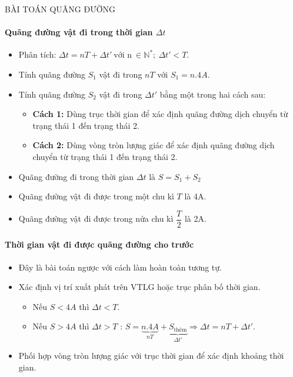 \begin{dang}{BÀI TOÁN QUÃNG ĐƯỜNG}
\setcounter{paragraph}{0}
\paragraph{Quãng đường vật đi trong thời gian $\Delta t$}
\begin{itemize}
\item Phân tích: $\Delta t=nT+\Delta t'\ \text{với n}\ \in \mathbb{N}^*;\ \Delta t'<T$.
\item Tính quãng đường $S_1$ vật đi trong $nT$ với $S_1 = n.4A$.
\item Tính quãng đường $S_2$ vật đi trong $\Delta t'$ bằng một trong hai cách sau:
\begin{itemize}
\item \textbf{Cách 1:} Dùng trục thời gian để xác định quãng đường dịch chuyển từ trạng thái 1 đến trạng thái 2.
\item \textbf{Cách 2:} Dùng vòng tròn lượng giác để xác định quãng đường dịch chuyển từ trạng thái 1 đến trạng thái 2.  
\end{itemize}
\item Quãng đường đi trong thời gian $\Delta t$ là $S=S_1+S_2$
\end{itemize}
\begin{note}
\begin{itemize}
\item Quãng đường vật đi được trong một chu kì $T$ là 4A.
\item Quãng đường vật đi được trong nửa chu kì $\dfrac{T}{2}$ là 2A.
\end{itemize}
\end{note}
\paragraph{Thời gian vật đi được quãng đường cho trước}
\begin{itemize}
\item Đây là bài toán ngược với cách làm hoàn toàn tương tự.
\item Xác định vị trí xuất phát trên VTLG hoặc trục phân bố thời gian.  
\begin{itemize}
\item Nếu $S < 4A$ thì $\Delta t < T$. 
\item  Nếu $S > 4A$ thì $\Delta t > T$ :
$S=\underbrace{n.4A}_{nT}+\underbrace{S_{\text{thêm}}}_{\Delta t'}\Rightarrow \Delta t=nT+\Delta t'$.  
\end{itemize}
\item Phối hợp vòng tròn lượng giác với trục thời gian để xác định khoảng thời gian.
\end{itemize}
\end{dang}